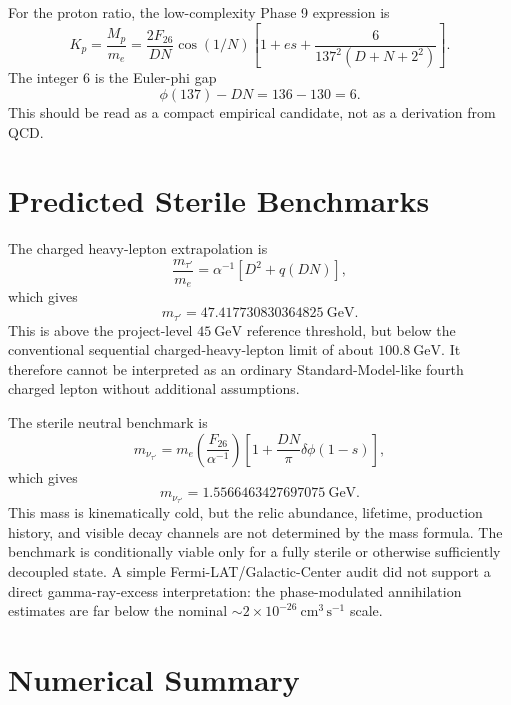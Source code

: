 \documentclass[11pt]{article}
\begin{document}
For the proton ratio, the low-complexity Phase 9 expression is
\begin{equation}
    K_p=\frac{M_p}{m_e}
    =
    \frac{2F_{26}}{DN}\cos(1/N)
    \left[
        1+es+\frac{6}{137^2(D+N+2^2)}
    \right].
\end{equation}
The integer $6$ is the Euler-phi gap
\begin{equation}
    \phi(137)-DN=136-130=6.
\end{equation}
This should be read as a compact empirical candidate, not as a derivation from
QCD.

\section{Predicted Sterile Benchmarks}

The charged heavy-lepton extrapolation is
\begin{equation}
    \frac{m_{\tau'}}{m_e}
    =
    \alpha^{-1}\left[D^2+q(DN)\right],
\end{equation}
which gives
\begin{equation}
    m_{\tau'}=47.417730830364825~\mathrm{GeV}.
\end{equation}
This is above the project-level $45~\mathrm{GeV}$ reference threshold, but
below the conventional sequential charged-heavy-lepton limit of about
$100.8~\mathrm{GeV}$.  It therefore cannot be interpreted as an ordinary
Standard-Model-like fourth charged lepton without additional assumptions.

The sterile neutral benchmark is
\begin{equation}
    m_{\nu_{\tau'}}
    =
    m_e
    \left(\frac{F_{26}}{\alpha^{-1}}\right)
    \left[
        1+\frac{DN}{\pi}\delta\phi(1-s)
    \right],
\end{equation}
which gives
\begin{equation}
    m_{\nu_{\tau'}}=1.5566463427697075~\mathrm{GeV}.
\end{equation}
This mass is kinematically cold, but the relic abundance, lifetime, production
history, and visible decay channels are not determined by the mass formula.
The benchmark is conditionally viable only for a fully sterile or otherwise
sufficiently decoupled state.  A simple Fermi-LAT/Galactic-Center audit did not
support a direct gamma-ray-excess interpretation: the phase-modulated
annihilation estimates are far below the nominal
$\sim2\times10^{-26}~\mathrm{cm^3\,s^{-1}}$ scale.

\section{Numerical Summary}
\end{document}
